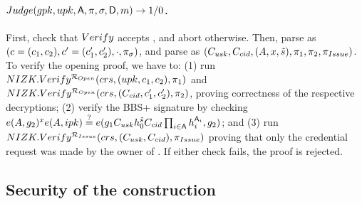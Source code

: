 \paragraph{$Judge(gpk,upk,\mathsf{A},\pi,\sigma,\mathsf{D},m)
  \rightarrow 1/0$.} %
First, check that $Verify$ accepts \sig, and abort otherwise. Then, parse
\sig as $(c=(c_1,c_2),c'=(c'_1,c'_2),\cdot,\pi_\sigma)$, and parse \oproof
as $(C_{usk},C_{cid},(A,x,\tilde{s}),\pi_1,\pi_2,
\pi_{Issue})$. To verify
the opening proof, we have to: (1) run $NIZK.Verify^{\mathcal{R}_{Open}}(crs,
(upk,c_1,c_2),\pi_1)$ and $NIZK.Verify^{\mathcal{R}_{Open}}(crs,
(C_{cid},c'_1,c'_2),\pi_2)$, proving correctness of the respective
decryptions; (2) verify the BBS+ signature by checking $e(A,g_2)^x
e(A,ipk) \stackrel{?}{=} e(g_1C_{usk}h_0^{\tilde{s}}C_{cid}
\prod_{i \in \mathsf{A}}h_i^{\mathsf{A}_i},g_2)$; and (3) run
$NIZK.Verify^{\mathcal{R}_{Issue}}(crs,(C_{usk},C_{cid}),\pi_{Issue})$
proving that only the credential request was made by the owner of \usk. If
either check fails, the proof is rejected.

\subsection{Security of the \GSAC construction}


